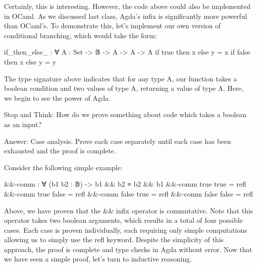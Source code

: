 \documentclass{lecturenotes}
\begin{document}
Certainly, this is interesting. However, the code above could also be implemented in OCaml.
As we discussed last class, Agda's infix is significantly more powerful than OCaml's.
To demonstrate this, let's implement our own version of conditional branching, which would take the form:

\begin{center}
    \begin{code}
        if_then_else_ : ∀ {A : Set} -> 𝔹 -> A -> A -> A
        if true then x else y = x 
        if false then x else y = y
    \end{code}
\end{center}

\pagebreak

The type signature above indicates that for any type A, our function takes a boolean condition and two values of type A, returning a value of type A.
Here, we begin to see the power of Agda.

\vspace{0.2in}

\noindent Stop and Think: How do we prove something about code which takes a boolean as an input?

\noindent Answer: Case analysis. Prove each case separately until each case has been exhausted and the proof is complete. 

\vspace{0.2in}

Consider the following simple example:

\begin{center}
    \begin{code}
        &&-comm : ∀ (b1 b2 : 𝔹) -> b1 && b2 ≡ b2 && b1
        &&-comm true true = refl
        &&-comm true false = refl
        &&-comm false true = refl
        &&-comm false false = refl
    \end{code}
\end{center}

Above, we have proven that the \textsf{\&\&} infix operator is commutative. 
Note that this operator takes two boolean arguments, which results in a total of four possible cases.
Each case is proven individually, each requiring only simple computations allowing us to simply use the \textsf{refl} keyword. 
Despite the simplicity of this approach, the proof is complete and type checks in Agda without error. 
Now that we have seen a simple proof, let's turn to inductive reasoning.

\vspace{0.2in}
\end{document}
